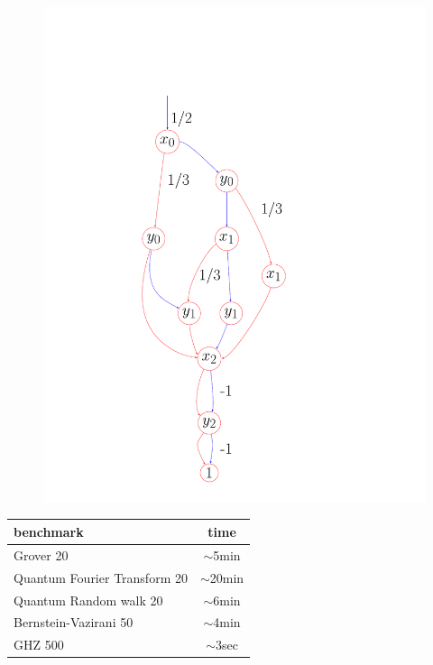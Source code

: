 \documentclass[aspectratio=1610,18pt]{ctexbeamer}
\begin{document}
\begin{frame}
\begin{figure}[tbh]
      \begin{minipage}{0.5\textwidth}  \includegraphics[width=\textwidth]{Projector.pdf}
      \end{minipage}
    \end{figure}
\end{frame}
\begin{frame}
  \begin{table}[]
    \Large
    \rule{0pt}{30pt}
    \begin{tabular}{l|c}
    benchmark & time \\\hline
    Grover 20       & $\sim$5min  \\
    Quantum Fourier Transform 20           & $\sim$20min \\
    Quantum Random walk 20           & $\sim$6min\\
    Bernstein-Vazirani 50           & $\sim$4min  \\
    GHZ 500         & $\sim$3sec \\
    \end{tabular}
    \end{table}
\end{frame}
\end{document}
